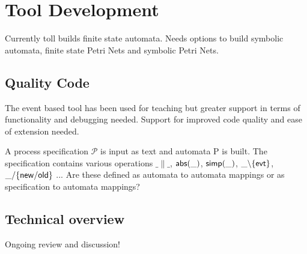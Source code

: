 \documentclass[]{article}
\begin{document}
 
\newpage    


\section{Tool Development}
Currently toll builds finite state automata. Needs options to build  symbolic automata, finite state Petri Nets and symbolic Petri Nets.

\subsection{Quality Code}
The event based tool has been used for teaching but greater support in terms of functionality and debugging needed. Support for improved code quality and ease of extension needed.


A process specification $\mathcal{P}$  is input as text and automata {\sf P} is built. The specification contains  various operations $\_\parallel\_$, ${\sf abs(\_)}$, ${\sf simp(\_)}$,  ${\sf \_\backslash\{evt\}}$, ${\sf \_/\{new/ old\}}$ ...
Are these defined as automata to automata mappings or as specification to automata mappings?






\subsection{Technical  overview} Ongoing review and discussion!
\end{document}
